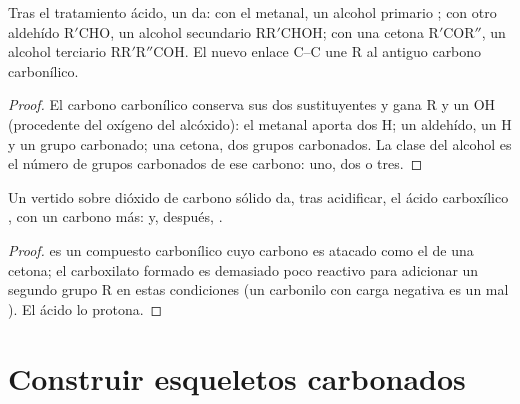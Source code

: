 \begin{proposition}\label{prop:b1:organomagnesium:carbonyl-addition}
Tras el tratamiento ácido, un   da: con el
metanal, un alcohol primario ; con otro aldehído
$\mathrm{R'CHO}$, un alcohol secundario $\mathrm{RR'CHOH}$; con una
cetona $\mathrm{R'COR''}$, un alcohol terciario $\mathrm{RR'R''COH}$. El
nuevo enlace C--C une R al antiguo carbono carbonílico.
\end{proposition}

\begin{proof}
El carbono carbonílico conserva sus dos sustituyentes y gana R y un OH
(procedente del oxígeno del alcóxido): el metanal aporta dos H; un
aldehído, un H y un grupo carbonado; una cetona, dos grupos carbonados.
La clase del alcohol es el número de grupos carbonados de ese carbono:
uno, dos o tres.
\end{proof}

\begin{proposition}\label{prop:b1:organomagnesium:co2}
Un  vertido sobre dióxido de carbono sólido da, tras
acidificar, el ácido carboxílico , con un carbono más:
 y, después,
.
\end{proposition}

\begin{proof}
 es un compuesto carbonílico cuyo carbono es atacado como el de
una cetona; el carboxilato formado es demasiado poco reactivo para
adicionar un segundo grupo R en estas condiciones (un carbonilo con carga
negativa es un mal ). El ácido lo protona.
\end{proof}

\section{Construir esqueletos carbonados}

